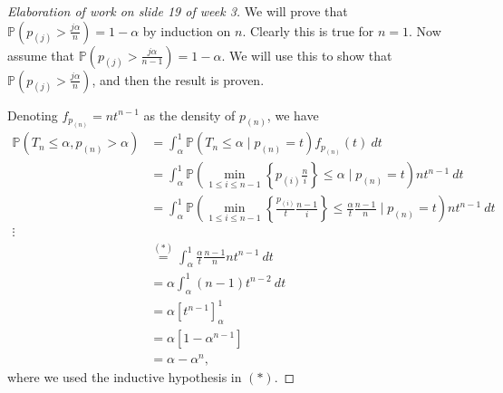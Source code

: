 \begin{proof}[Elaboration of work on slide 19 of week 3]


We will prove that \(\mathbb{P} \left( p_{(j)} > \frac{j \alpha}{n} \right) = 1 - \alpha\) by induction on \(n\). Clearly this is true for \( n = 1\). Now assume that \(\mathbb{P} \left( p_{(j)} > \frac{j \alpha}{n - 1} \right) = 1 - \alpha\). We will use this to show that \(\mathbb{P} \left( p_{(j)} > \frac{j \alpha}{n} \right)\), and then the result is proven.


%

Denoting \(f_{p_{(n)}} = nt^{n-1}\) as the density of \(p_{(n)}\), we have
\begin{align*}
\mathbb{P} \left( T_n \leq \alpha, p_{(n)} > \alpha \right) & = \int_\alpha^1 \mathbb{P} \left( T_n \leq \alpha \mid p_{(n)} = t \right)f_{p_{(n)}}(t) \ dt
\\ & = \int_\alpha^1 \mathbb{P} \left(  \min_{1 \leq i \leq n - 1} \left\{ p_{(i)} \frac{n}{i} \right\} \leq \alpha \mid p_{(n)} = t \right)  nt^{n-1} \ dt
\\ & = \int_\alpha^1 \mathbb{P} \left(  \min_{1 \leq i \leq n - 1} \left\{ \frac{p_{(i)}}{t} \frac{n - 1}{i} \right\} \leq \frac{\alpha}{t} \frac{n-1}{n} \mid p_{(n)} = t \right)  nt^{n-1} \ dt
\\ \vdots
\\ & \stackrel{(*)}{=} \int_\alpha^1 \frac{\alpha}{t} \frac{n-1}{n}  nt^{n-1} \ dt
\\ & = \alpha \int_\alpha^1  (n-1) t^{n-2} \ dt
\\ & = \alpha \left[ t^{n-1} \right]_\alpha^1  
\\ & = \alpha \left[ 1 - \alpha^{n-1} \right]
\\ & = \alpha - \alpha^n,
\end{align*}
where we used the inductive hypothesis in \((*)\).

\end{proof}

